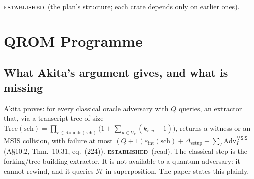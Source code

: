\documentclass[11pt]{article}
\newcommand{\epitag}[3]{\colorbox{#2}{\textcolor{#1}{\textsc{\footnotesize\bfseries #3}}}}
\newcommand{\established}{\epitag{estgreen}{estbg}{established}}
\renewcommand{\_}{\textunderscore\allowbreak{}}
\theoremstyle{definition}
\begin{document}
\established\ (the plan's structure; each crate depends only on earlier ones).

\section{QROM Programme}
\label{sec:qrom}
\subsection{What Akita's argument gives, and what is missing}
Akita proves: for every classical oracle adversary with $Q$ queries, an extractor that, via a transcript tree of size $\mathrm{Tree}(\mathrm{sch})=\prod_{r\in\mathrm{Rounds}(\mathrm{sch})}\big(1+\sum_{u\in U_r}(k_{r,u}-1)\big)$, returns a witness or an MSIS collision, with failure at most $(Q+1)\varepsilon_{\mathrm{int}}(\mathrm{sch})+\Delta_{\mathrm{setup}}+\sum_I\mathrm{Adv}^{\mathsf{MSIS}}_I$ (A\S10.2, Thm.~10.31, eq.~(224)). \established\ (read).
The classical step is the forking/tree-building extractor. It is not available to a quantum adversary: it cannot rewind, and it queries $\mathcal{H}$ in superposition. The paper states this plainly.
\end{document}
